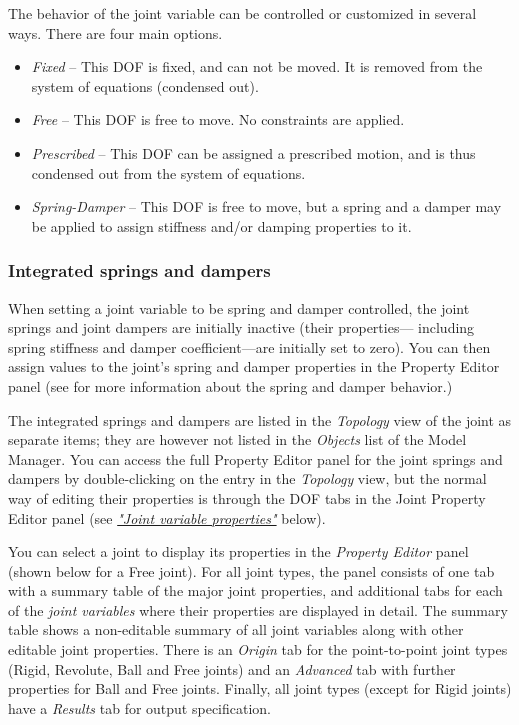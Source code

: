 The behavior of the joint variable can be controlled or customized in
several ways. There are four main options.

\begin{itemize}
\item{\sl Fixed} --
  This DOF is fixed, and can not be moved.
  It is removed from the system of equations (condensed out).
\item{\sl Free} --
  This DOF is free to move. No constraints are applied.
\item{\sl Prescribed} --
  This DOF can be assigned a prescribed motion,
  and is thus condensed out from the system of equations.
\item{\sl Spring-Damper} --
  This DOF is free to move, but a spring and a damper may be applied
  to assign stiffness and/or damping properties to it.
\end{itemize}


\subsubsection{Integrated springs and dampers}

When setting a joint variable to be spring and damper controlled,
the joint springs and joint dampers are initially inactive (their properties---
including spring stiffness and damper coefficient---are initially set to zero).
You can then assign values to the joint's spring and damper properties in the
Property Editor panel (see
for more information about the spring and damper behavior.)

The integrated springs and dampers are listed in the {\sl Topology} view of the
joint as separate items; they are however not listed in the {\sl Objects} list
of the Model Manager. You can access the full Property Editor panel for the
joint springs and dampers by double-clicking on the entry in the {\sl Topology}
view, but the normal way of editing their properties is through the DOF tabs
in the Joint Property Editor panel (see
\protect\hyperlink{joint-variable-properties}{\sl"Joint variable properties"}
below).



You can select a joint to display its properties in the {\sl Property Editor}
panel (shown below for a Free joint). For all joint types, the panel consists of
one tab with a summary table of the major joint properties, and additional tabs
for each of the {\sl joint variables} where their properties are displayed in
detail. The summary table shows a non-editable summary of all joint variables
along with other editable joint properties.
There is an {\sl Origin} tab for the point-to-point joint types
(Rigid, Revolute, Ball and Free joints) and an {\sl Advanced} tab with further
properties for Ball and Free joints.
Finally, all joint types (except for Rigid joints) have a {\sl Results} tab
for output specification.


